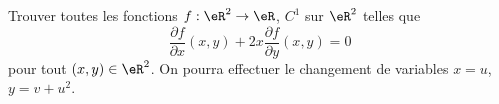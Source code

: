 \begin{exercice}\label{exoCalculDifferentiel0010}

Trouver toutes les fonctions $f:\eR^2\to\eR$, ${ C}^1$ sur $\eR^2$ telles que 
\begin{equation}		\label{eCDuzEqares}
	\frac{\partial f}{\partial x}(x,y) + 2x \frac{\partial f}{\partial y}(x,y) = 0
\end{equation}
 pour tout $(x,y)\in\eR^2$. On pourra effectuer le changement de variables $x= u $, $y= v +u^2 $.

\end{exercice}
